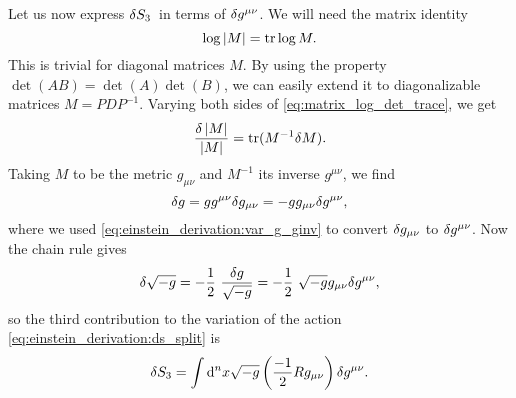Let us now express $\delta S_3$ in terms of $\delta g^{\mu \nu}$.
We will need the matrix identity
\begin{equation}
	\log{\left\lvert M \right\rvert} = \text{tr} \log{M} .
	\label{eq:matrix_log_det_trace}
\end{equation}
This is trivial for diagonal matrices $M$.
By using the property $\det(AB) = \det(A) \det(B)$, we can easily extend it to diagonalizable matrices $M = P D P^{-1}$.
Varying both sides of \cref{eq:matrix_log_det_trace}, we get \cite{ref:matrix_ln_det_tr_exercise}
\begin{equation}
	\frac{\delta \left\lvert M \right\rvert}{\left\lvert M \right\rvert} = \text{tr} (M^{-1} \delta M) .
\end{equation}
Taking $M$ to be the metric $g_{\mu \nu}$ and $M^{-1}$ its inverse $g^{\mu \nu}$, we find
\begin{equation}
	\delta g = g g^{\mu \nu} \delta g_{\mu \nu} = -g g_{\mu \nu} \delta g^{\mu \nu} ,
\end{equation}
where we used \cref{eq:einstein_derivation:var_g_ginv} to convert $\delta g_{\mu \nu}$ to $\delta g^{\mu \nu}$.
Now the chain rule gives
\begin{equation}
	\variation{\sqrt{-g}} = -\frac{1}{2} \frac{\variation{g}}{\sqrt{-g}} = -\frac{1}{2} \sqrt{-g} g_{\mu \nu} \variation{g^{\mu \nu}},
\end{equation}
so the third contribution to the variation of the action \eqref{eq:einstein_derivation:ds_split} is
\begin{equation}
	\delta S_3 = \int \mathop{}\!\mathrm{d}^n x \sqrt{-g} \left( \frac{-1}{2} R g_{\mu \nu} \right) \delta g^{\mu \nu} .
\end{equation}

